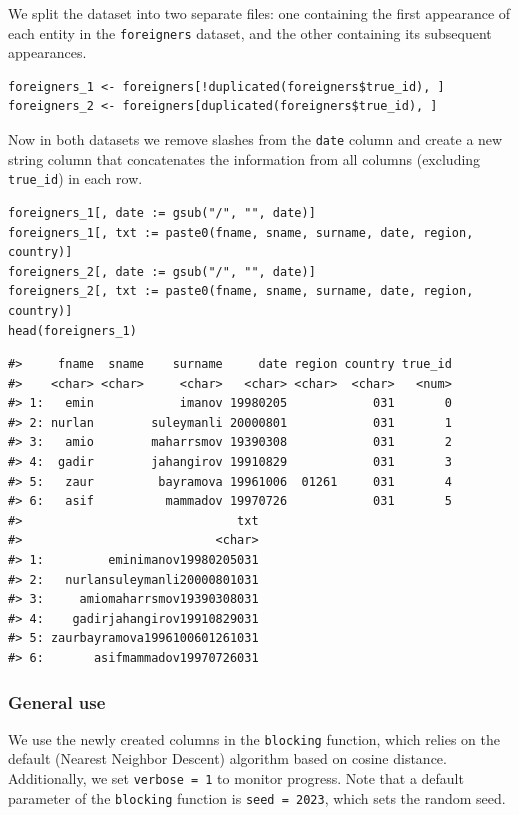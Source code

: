 We split the dataset into two separate files: one containing the first appearance of each entity in the \texttt{foreigners} dataset, and the other containing its subsequent appearances.

\begin{verbatim}
foreigners_1 <- foreigners[!duplicated(foreigners$true_id), ]
foreigners_2 <- foreigners[duplicated(foreigners$true_id), ]
\end{verbatim}

Now in both datasets we remove slashes from the \texttt{date} column and create a new string column that concatenates the information from all columns (excluding \texttt{true\_id}) in each row.

\begin{verbatim}
foreigners_1[, date := gsub("/", "", date)]
foreigners_1[, txt := paste0(fname, sname, surname, date, region, country)]
foreigners_2[, date := gsub("/", "", date)]
foreigners_2[, txt := paste0(fname, sname, surname, date, region, country)]
head(foreigners_1)
\end{verbatim}

\begin{verbatim}
#>     fname  sname    surname     date region country true_id
#>    <char> <char>     <char>   <char> <char>  <char>   <num>
#> 1:   emin            imanov 19980205            031       0
#> 2: nurlan        suleymanli 20000801            031       1
#> 3:   amio        maharrsmov 19390308            031       2
#> 4:  gadir        jahangirov 19910829            031       3
#> 5:   zaur         bayramova 19961006  01261     031       4
#> 6:   asif          mammadov 19970726            031       5
#>                              txt
#>                           <char>
#> 1:         eminimanov19980205031
#> 2:   nurlansuleymanli20000801031
#> 3:     amiomaharrsmov19390308031
#> 4:    gadirjahangirov19910829031
#> 5: zaurbayramova1996100601261031
#> 6:       asifmammadov19970726031
\end{verbatim}

\subsubsection{General use}\label{general-use}

We use the newly created columns in the \texttt{blocking} function, which relies on the default  (Nearest Neighbor Descent) algorithm based on cosine distance. Additionally, we set \texttt{verbose\ =\ 1} to monitor progress. Note that a default parameter of the \texttt{blocking} function is \texttt{seed\ =\ 2023}, which sets the random seed.

